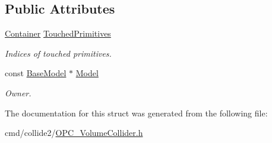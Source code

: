 \subsection*{Public Attributes}
\begin{DoxyCompactItemize}
\item 
\hyperlink{classContainer}{Container} \hyperlink{structVolumeCache_a0f1a8f7336e3f0c1425053c21d98cdcd}{Touched\+Primitives}\hypertarget{structVolumeCache_a0f1a8f7336e3f0c1425053c21d98cdcd}{}\label{structVolumeCache_a0f1a8f7336e3f0c1425053c21d98cdcd}

\begin{DoxyCompactList}\small\item\em Indices of touched primitives. \end{DoxyCompactList}\item 
const \hyperlink{classBaseModel}{Base\+Model} $\ast$ \hyperlink{structVolumeCache_a62019b1a5c5bd816c0d799fea84e1607}{Model}\hypertarget{structVolumeCache_a62019b1a5c5bd816c0d799fea84e1607}{}\label{structVolumeCache_a62019b1a5c5bd816c0d799fea84e1607}

\begin{DoxyCompactList}\small\item\em Owner. \end{DoxyCompactList}\end{DoxyCompactItemize}


The documentation for this struct was generated from the following file\+:\begin{DoxyCompactItemize}
\item 
cmd/collide2/\hyperlink{OPC__VolumeCollider_8h}{O\+P\+C\+\_\+\+Volume\+Collider.\+h}\end{DoxyCompactItemize}
